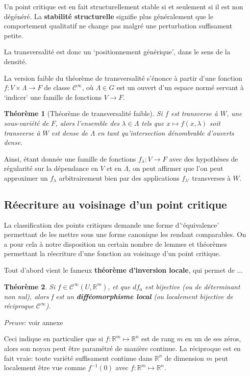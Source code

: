 \documentclass{article}
\newcommand{\cinf}{\mathcal{C}^\infty}
\newcommand{\R}{\mathbb{R}}
\newtheorem{thm}{Théorème}
\theoremstyle{definition}
\begin{document}
Un point critique est en fait structurellement stable si et seulement si il est non dégénéré.
La \textbf{stabilité structurelle} signifie plus généralement que le comportement qualitatif ne change pas malgré une perturbation suffisament petite.

La transversalité est donc un `positionnement générique', dans le sens de la densité.

La version faible du théorème de transversalité s'énonce à partir d'une fonction $f: V\times\Lambda\to F$ de classe $\cinf$, où $\Lambda\in G$ est un ouvert d'un espace normé servant à `indicer' une famille de fonctions $V\to F$.

\begin{thm}[Théorème de transversalité faible]
	Si $f$ est transverse à $W$, une sous-variété de $F$, alors l'ensemble des $\lambda\in\Lambda$ tels que $x\mapsto f(x,\lambda)$ soit transverse à $W$ est dense de $\Lambda$ en tant qu'intersection dénombrable d'ouverts dense.
\end{thm}

Ainsi, étant donnée une famille de fonctions $f_\lambda: V\to F$ avec des hypothèses de régularité sur la dépendance en $V$ et en $\Lambda$, on peut affirmer que l'on peut approximer un $f_\lambda$ arbitrairement bien par des applications $f_{\lambda'}$ transverses à $W$.

\subsection{Réecriture au voisinage d'un point critique}

La classification des points critiques demande une forme d'`équivalence' permettant de les mettre sous une forme canonique les rendant comparables.
On a pour cela à notre disposition un certain nombre de lemmes et théorèmes permettant la réecriture d'une fonction au voisinage d'un point critique.

Tout d'abord vient le fameux \textbf{théorème d'inversion locale}, qui permet de ...

\begin{thm}
Si $f\in\cinf(U,\R^m)$, et que $df_a$ est bijective (ou de déterminant non nul), alors f est un \textbf{difféomorphisme local} (ou localement bijective de réciproque $\cinf$).
\end{thm}

\textit{Preuve}: voir annexe

Ceci indique en particulier que si $f:\R^m\mapsto\R^n$ est de rang $m$ en un de ses zéros, alors son noyau peut être paramétré de manière continue.
La réciproque est en fait vraie: toute variété suffisament continue dans $\R^n$ de dimension $m$ peut localement être vue comme $f^{-1}(0)$ avec $f:\R^m\mapsto\R^n$.
\end{document}
